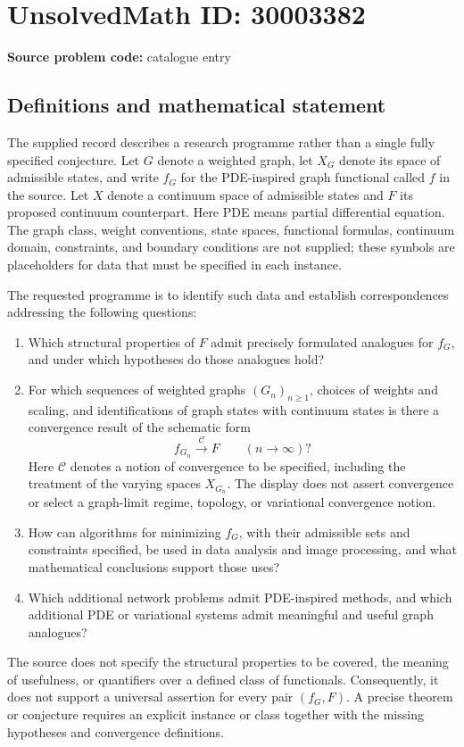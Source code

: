 \documentclass[11pt]{article}
\begin{document}
\section*{UnsolvedMath ID: 30003382}
\textbf{Source problem code:} catalogue entry
\subsection{Definitions and mathematical statement}
The supplied record describes a research programme rather than a single fully specified conjecture. Let \(G\) denote a weighted graph, let \(X_G\) denote its space of admissible states, and write \(f_G\) for the PDE-inspired graph functional called \(f\) in the source. Let \(X\) denote a continuum space of admissible states and \(F\) its proposed continuum counterpart. Here PDE means partial differential equation. The graph class, weight conventions, state spaces, functional formulas, continuum domain, constraints, and boundary conditions are not supplied; these symbols are placeholders for data that must be specified in each instance.

The requested programme is to identify such data and establish correspondences addressing the following questions:
\begin{enumerate}
\item Which structural properties of \(F\) admit precisely formulated analogues for \(f_G\), and under which hypotheses do those analogues hold?
\item For which sequences of weighted graphs \((G_n)_{n\geq 1}\), choices of weights and scaling, and identifications of graph states with continuum states is there a convergence result of the schematic form
\[
 f_{G_n}\xrightarrow{\mathcal C}F \qquad (n\to\infty)?
\]
Here \(\mathcal C\) denotes a notion of convergence to be specified, including the treatment of the varying spaces \(X_{G_n}\). The display does not assert convergence or select a graph-limit regime, topology, or variational convergence notion.
\item How can algorithms for minimizing \(f_G\), with their admissible sets and constraints specified, be used in data analysis and image processing, and what mathematical conclusions support those uses?
\item Which additional network problems admit PDE-inspired methods, and which additional PDE or variational systems admit meaningful and useful graph analogues?
\end{enumerate}
The source does not specify the structural properties to be covered, the meaning of usefulness, or quantifiers over a defined class of functionals. Consequently, it does not support a universal assertion for every pair \((f_G,F)\). A precise theorem or conjecture requires an explicit instance or class together with the missing hypotheses and convergence definitions.
\end{document}

